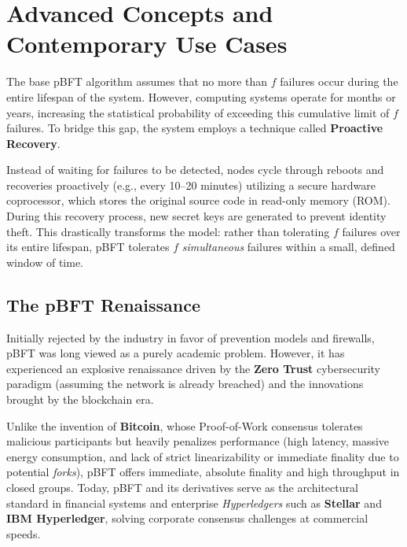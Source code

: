 \section{Advanced Concepts and Contemporary Use Cases}
The base pBFT algorithm assumes that no more than $f$ failures occur during the entire lifespan of the system. However, computing systems operate for months or years, increasing the statistical probability of exceeding this cumulative limit of $f$ failures. To bridge this gap, the system employs a technique called \textbf{Proactive Recovery}. 

Instead of waiting for failures to be detected, nodes cycle through reboots and recoveries proactively (e.g., every 10–20 minutes) utilizing a secure hardware coprocessor, which stores the original source code in read-only memory (ROM). During this recovery process, new secret keys are generated to prevent identity theft. This drastically transforms the model: rather than tolerating $f$ failures over its entire lifespan, pBFT tolerates $f$ \textit{simultaneous} failures within a small, defined window of time.

\subsection{The pBFT Renaissance}
Initially rejected by the industry in favor of prevention models and firewalls, pBFT was long viewed as a purely academic problem. However, it has experienced an explosive renaissance driven by the \textbf{Zero Trust} cybersecurity paradigm (assuming the network is already breached) and the innovations brought by the blockchain era.

Unlike the invention of \textbf{Bitcoin}, whose Proof-of-Work consensus tolerates malicious participants but heavily penalizes performance (high latency, massive energy consumption, and lack of strict linearizability or immediate finality due to potential \textit{forks}), pBFT offers immediate, absolute finality and high throughput in closed groups. Today, pBFT and its derivatives serve as the architectural standard in financial systems and enterprise \textit{Hyperledgers} such as \textbf{Stellar} and \textbf{IBM Hyperledger}, solving corporate consensus challenges at commercial speeds.